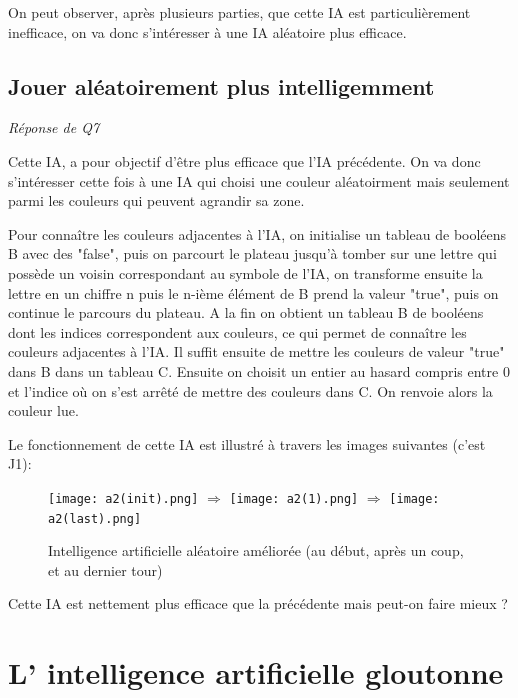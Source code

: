 \documentclass[a4paper,11pt]{article}
\begin{document}
On peut observer, après plusieurs parties, que cette IA est particulièrement 
inefficace, on va donc s'intéresser à une IA aléatoire plus efficace.


\subsection{Jouer aléatoirement plus intelligemment}
\emph{Réponse de Q7}

Cette IA, a pour objectif d'être plus efficace que l'IA précédente. On va donc
s'intéresser cette fois à une IA qui choisi une couleur aléatoirment mais 
seulement parmi les couleurs qui peuvent agrandir sa zone. 

Pour connaître les couleurs adjacentes à l'IA, on initialise un tableau de
booléens B avec des "false", puis on parcourt le plateau jusqu'à tomber sur une lettre qui possède 
un voisin correspondant au symbole de l'IA, on transforme ensuite la lettre 
en un chiffre n puis le n-ième élément de B prend la valeur "true", puis on continue
le parcours du plateau. A la fin on obtient un tableau B de booléens dont les indices correspondent aux couleurs, ce qui permet de connaître
les couleurs adjacentes à l'IA. Il suffit ensuite de mettre les couleurs de valeur "true" dans B dans un tableau C. Ensuite on choisit un entier au hasard compris entre 0 et l'indice où on s'est arrêté de mettre des couleurs dans C. On renvoie alors la couleur lue.

Le fonctionnement de cette IA est illustré à travers les images suivantes (c'est J1):

\begin{figure}[!h]
\begin{center}
\texttt{[image: a2(init).png]}
{\Huge
\begin{math}
\Rightarrow
\end{math}}
\texttt{[image: a2(1).png]}
{\Huge
\begin{math}
\Rightarrow
\end{math}}
\texttt{[image: a2(last).png]}
\caption{Intelligence artificielle aléatoire améliorée (au début, après un coup, et au dernier tour)}
\end{center}
\end{figure}
Cette IA est nettement plus efficace que la précédente mais peut-on faire mieux ?


\section{L' intelligence artificielle gloutonne}
\end{document}
